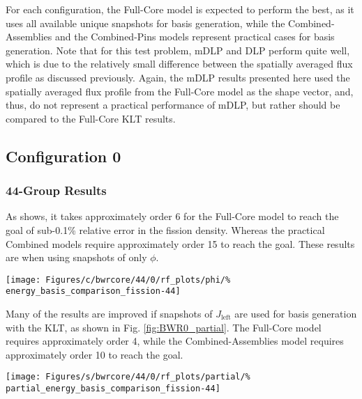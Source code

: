 For each configuration, the Full-Core model is expected to perform the best, as 
it uses all available unique snapshots for basis generation, while the 
Combined-Assemblies and the Combined-Pins models represent practical cases for 
basis generation. 
 Note that for this test problem, mDLP and DLP perform quite well, which is 
due to the relatively small difference between the spatially averaged 
flux profile as discussed previously.  Again, the mDLP results presented here 
used the spatially averaged flux profile from the Full-Core model as the shape 
vector, and, thus, do not represent a practical performance of mDLP, but rather 
should be compared to the Full-Core KLT results.

\subsection{Configuration 0}

\subsubsection{44-Group Results}

As  shows, it takes approximately order 6 for the 
Full-Core model to reach the goal of sub-0.1\% relative error in the fission 
density.  Whereas the practical Combined models require approximately order 15 
to 
reach the goal.  These results are when using snapshots of only $\phi$.  

\begin{figure*}[tb]
    \centering
    \texttt{[image: Figures/c/bwrcore/44/0/rf\_plots/phi/\%
        energy\_basis\_comparison\_fission-44]}
    \caption{Relative error for the 44-group, BWR-Core 0 test problem using 
        snapshots of only $\phi$}
    \label{fig:BWR0_phi}
\end{figure*}

Many of the results are improved if snapshots of $J_{\text{left}}$ are 
used for basis generation with the KLT, as shown in Fig. 
\ref{fig:BWR0_partial}.  The Full-Core model requires approximately order 4, 
while the Combined-Assemblies model requires approximately order 10 to reach 
the goal.

\begin{figure*}[tb]
    \centering
    \texttt{[image: Figures/s/bwrcore/44/0/rf\_plots/partial/\%
        partial\_energy\_basis\_comparison\_fission-44]}
    \caption{Relative error for the 44-group, BWR-Core 0 test problem using 
        snapshots of only $J_{\text{left}}$}
    \label{fig:BWR0_partial}
\end{figure*}

